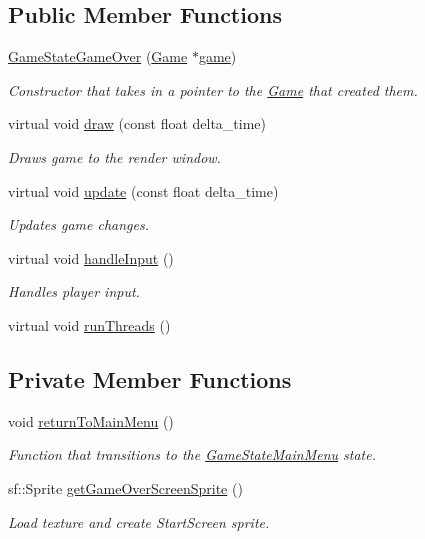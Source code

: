 \subsection*{Public Member Functions}
\begin{DoxyCompactItemize}
\item 
\hyperlink{class_game_state_game_over_ac04ea29d97aade1e47fa1f25aa04f4c3}{Game\+State\+Game\+Over} (\hyperlink{class_game}{Game} $\ast$\hyperlink{class_game_state_a355a79415b9ef63c2aec1448a99f6e71}{game})
\begin{DoxyCompactList}\small\item\em Constructor that takes in a pointer to the \hyperlink{class_game}{Game} that created them. \end{DoxyCompactList}\item 
virtual void \hyperlink{class_game_state_game_over_a1e88ff4cbd7d608858604efdb16e2adc}{draw} (const float delta\+\_\+time)
\begin{DoxyCompactList}\small\item\em Draws game to the render window. \end{DoxyCompactList}\item 
virtual void \hyperlink{class_game_state_game_over_a11d874c60455411c70a9ebaab2db6a17}{update} (const float delta\+\_\+time)
\begin{DoxyCompactList}\small\item\em Updates game changes. \end{DoxyCompactList}\item 
virtual void \hyperlink{class_game_state_game_over_a10777cb963bba4f1c80edd6112888585}{handle\+Input} ()
\begin{DoxyCompactList}\small\item\em Handles player input. \end{DoxyCompactList}\item 
virtual void \hyperlink{class_game_state_game_over_a7a9b37edd4132ee9b500a05aecfe57fb}{run\+Threads} ()
\end{DoxyCompactItemize}
\subsection*{Private Member Functions}
\begin{DoxyCompactItemize}
\item 
void \hyperlink{class_game_state_game_over_aca1764af639f0e1ca817d93a2a19d45a}{return\+To\+Main\+Menu} ()
\begin{DoxyCompactList}\small\item\em Function that transitions to the \hyperlink{class_game_state_main_menu}{Game\+State\+Main\+Menu} state. \end{DoxyCompactList}\item 
sf\+::\+Sprite \hyperlink{class_game_state_game_over_ae89ff3f534ad24e6cf9482b2089c6fcf}{get\+Game\+Over\+Screen\+Sprite} ()
\begin{DoxyCompactList}\small\item\em Load texture and create Start\+Screen sprite. \end{DoxyCompactList}\end{DoxyCompactItemize}
